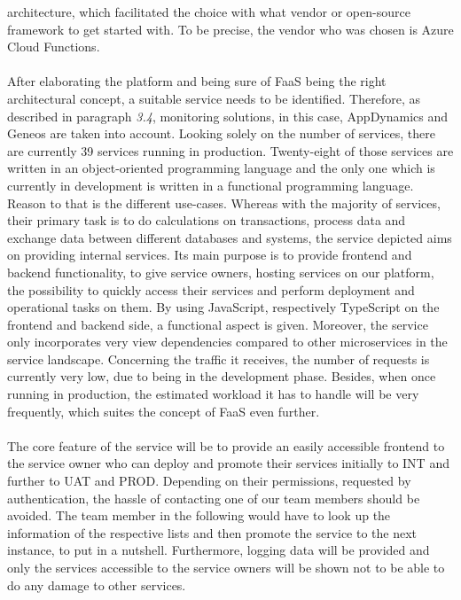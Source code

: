 \documentclass[a4paper,11pt, pagesize]{scrartcl}
\begin{document}
\begin{spacing}{1.2}
architecture, which facilitated the choice with what vendor or open-source framework to get started with. To be precise, the vendor who was chosen is Azure Cloud Functions.\\\\After elaborating the platform and being sure of FaaS being the right architectural concept, a suitable service needs to be identified. Therefore, as described in paragraph \textit{3.4}, monitoring solutions, in this case, AppDynamics and Geneos are taken into account. Looking solely on the number of services, there are currently 39 services running in production. Twenty-eight of those services are written in an object-oriented programming language and the only one which is currently in development is written in a functional programming language. Reason to that is the different use-cases. Whereas with the majority of services, their primary task is to do calculations on transactions, process data and exchange data between different databases and systems, the service depicted aims on providing internal services. Its main purpose is to provide frontend and backend functionality, to give service owners, hosting services on our platform, the possibility to quickly access their services and perform deployment and operational tasks on them. By using JavaScript, respectively TypeScript on the frontend and backend side, a functional aspect is given. Moreover, the service only incorporates very view dependencies compared to other microservices in the service landscape. Concerning the traffic it receives, the number of requests is currently very low, due to being in the development phase. Besides, when once running in production, the estimated workload it has to handle will be very frequently, which suites the concept of FaaS even further.\\\\The core feature of the service will be to provide an easily accessible frontend to the service owner who can deploy and promote their services initially to INT and further to UAT and PROD. Depending on their permissions, requested by authentication, the hassle of contacting one of our team members should be avoided. The team member in the following would have to look up the information of the respective lists and then promote the service to the next instance, to put in a nutshell. Furthermore, logging data will be provided and only the services accessible to the service owners will be shown not to be able to do any damage to other services.\\ 

\end{spacing}
\end{document}
